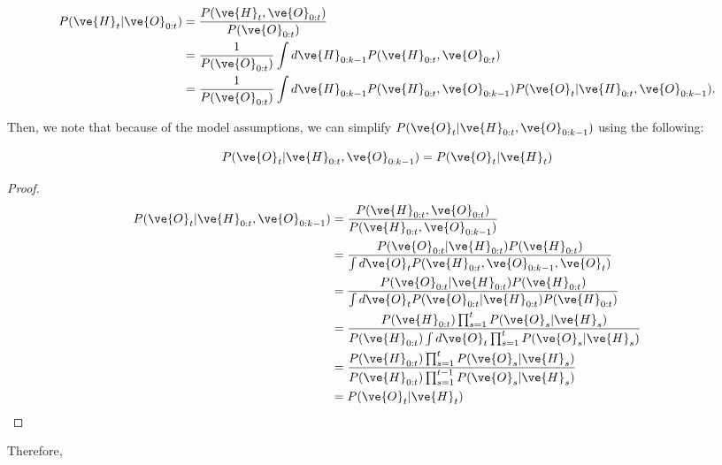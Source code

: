 \documentclass{article}
\begin{document}
\begin{subequations}
\begin{align}  \label{app_eq:x|y1}
P(\ve{H}_t|\ve{O}_{0:t}) &= \frac{P(\ve{H}_t,\ve{O}_{0:t})}{P(\ve{O}_{0:t})} \\
 &= \frac{1}{P(\ve{O}_{0:t})} \int d\ve{H}_{0:k-1} P(\ve{H}_{0:t}, \ve{O}_{0:t})\\
 &= \frac{1}{P(\ve{O}_{0:t})} \int d\ve{H}_{0:k-1}  P(\ve{H}_{0:t}, \ve{O}_{0:k-1}) P(\ve{O}_t | \ve{H}_{0:t}, \ve{O}_{0:k-1}).
\end{align}
\end{subequations}

\noindent Then, we note that because of the model assumptions, we can simplify $P(\ve{O}_t | \ve{H}_{0:t}, \ve{O}_{0:k-1})$ using the following:

\begin{lemma} \label{lem:1}
\begin{equation}
P(\ve{O}_t | \ve{H}_{0:t}, \ve{O}_{0:k-1}) = P(\ve{O}_t | \ve{H}_t)
\end{equation}
\end{lemma}

\begin{proof}
\begin{subequations}
\begin{align}
P(\ve{O}_t | \ve{H}_{0:t}, \ve{O}_{0:k-1}) &= \frac{P(\ve{H}_{0:t}, \ve{O}_{0:t})}{P(\ve{H}_{0:t}, \ve{O}_{0:k-1})}\\
&=\frac{P(\ve{O}_{0:t} | \ve{H}_{0:t}) P(\ve{H}_{0:t})}{\int d\ve{O}_t P(\ve{H}_{0:t}, \ve{O}_{0:k-1}, \ve{O}_t)}\\
&=\frac{P(\ve{O}_{0:t} | \ve{H}_{0:t}) P(\ve{H}_{0:t})}{\int d\ve{O}_t P(\ve{O}_{0:t} | \ve{H}_{0:t}) P(\ve{H}_{0:t})}\\
&=\frac{P(\ve{H}_{0:t}) \prod_{s=1}^{t} P(\ve{O}_s | \ve{H}_s)}{P(\ve{H}_{0:t}) \int d\ve{O}_t \prod_{s=1}^t  P(\ve{O}_s | \ve{H}_s)}\\
&=\frac{P(\ve{H}_{0:t}) \prod_{s=1}^t P(\ve{O}_s | \ve{H}_s)}{P(\ve{H}_{0:t}) \prod_{s=1}^{t-1} P(\ve{O}_s | \ve{H}_s)}\\
&=P(\ve{O}_t|\ve{H}_t)
\end{align}
\end{subequations}
\end{proof}

\noindent Therefore,
\end{document}
